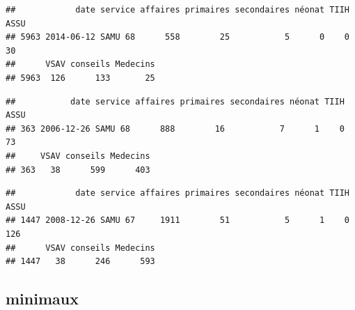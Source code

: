 \documentclass[]{article}
\newenvironment{Shaded}{\begin{snugshade}}{\end{snugshade}}
\newcommand{\KeywordTok}[1]{\textcolor[rgb]{0.13,0.29,0.53}{\textbf{{#1}}}}
\newcommand{\DataTypeTok}[1]{\textcolor[rgb]{0.13,0.29,0.53}{{#1}}}
\newcommand{\StringTok}[1]{\textcolor[rgb]{0.31,0.60,0.02}{{#1}}}
\newcommand{\NormalTok}[1]{{#1}}
\begin{document}
\begin{Shaded}
\end{Shaded}

\begin{verbatim}
##            date service affaires primaires secondaires néonat TIIH ASSU
## 5963 2014-06-12 SAMU 68      558        25           5      0    0   30
##      VSAV conseils Medecins
## 5963  126      133       25
\end{verbatim}

\begin{Shaded}
\end{Shaded}

\begin{verbatim}
##           date service affaires primaires secondaires néonat TIIH ASSU
## 363 2006-12-26 SAMU 68      888        16           7      1    0   73
##     VSAV conseils Medecins
## 363   38      599      403
\end{verbatim}

\begin{Shaded}
\end{Shaded}

\begin{verbatim}
##            date service affaires primaires secondaires néonat TIIH ASSU
## 1447 2008-12-26 SAMU 67     1911        51           5      1    0  126
##      VSAV conseils Medecins
## 1447   38      246      593
\end{verbatim}

\subsection{minimaux}\label{minimaux}
\end{document}

